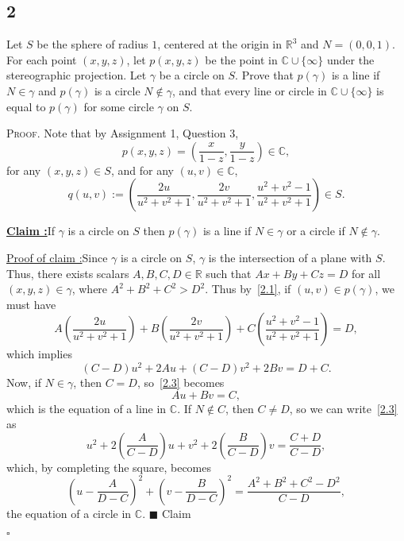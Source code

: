 \documentclass[12pt]{article}
\newcounter{ProofCounter}
\newcounter{ClaimCounter}[ProofCounter]
\newenvironment{Proof}{\stepcounter{ProofCounter}\textsc{Proof.}}{\hfill$\square$}
\newenvironment{claim}[1]{\vspace{1mm}\stepcounter{ClaimCounter}\par\noindent\underline{\bf Claim \theClaimCounter:}\space#1}{}
\newenvironment{claimproof}[1]{\par\noindent\underline{Proof of claim \theClaimCounter:}\space#1}{\hfill $\blacksquare$ Claim \theClaimCounter}
\begin{document}
\subsection*{2}
\begin{tcolorbox}
  Let $S$ be the sphere of radius $1$, centered at the origin in $\mathbb{R}^{3}$ and $N = (0,0,1)$. For each point $(x,y,z)$, let $p(x,y,z)$ be the
  point in $\mathbb{C}\cup \{\infty\}$ under the stereographic projection. Let $\gamma$ be a circle on $S$. Prove that $p(\gamma)$ is a line if
  $N \in \gamma$ and $p(\gamma)$ is a circle $N\notin \gamma$, and that every line or circle in $\mathbb{C}\cup\{\infty\}$ is equal to $p(\gamma)$ for
  some circle $\gamma$ on $S$.
\end{tcolorbox}
\begin{Proof}
  Note that by Assignment 1, Question 3,
  \begin{equation}
    p(x,y,z) = \left( \frac{x}{1 - z}, \frac{y}{1 - z}\right) \in \mathbb{C},
    \label{2.1}
  \end{equation}
  for any $(x,y,z) \in S$, and for any $(u,v) \in \mathbb{C}$,
  \begin{equation}
    q(u,v) := \left( \frac{2u}{u^{2} + v^{2} + 1}, \frac{2v}{u^{2} + v^{2} + 1}, \frac{u^{2} + v^{2} -1}{u^{2} + v^{2} + 1}\right) \in S. 
    \label{2.2}
  \end{equation}
  \begin{claim}
    If $\gamma$ is a circle on $S$ then $p(\gamma)$ is a line if $N \in \gamma$ or a circle if $N \notin \gamma$.
  \end{claim}
  \begin{claimproof}
    Since $\gamma$ is a circle on $S$, $\gamma$ is the intersection of a plane with $S$. Thus, there exists scalars $A,B,C,D \in \mathbb{R}$ such that 
    $Ax + By + Cz = D$ for all $(x,y,z) \in \gamma$, where $A^2 + B^2 + C^2 > D^{2}$. Thus by~\eqref{2.1}, if $(u,v) \in p(\gamma)$, we must have
    \[ A\left( \frac{2u}{u^{2} + v^{2} + 1} \right) + B\left( \frac{2v}{u^{2} + v^{2} + 1} \right) + C\left( \frac{u^{2} + v^{2} - 1}{u^{2} + v^{2} +
    1}\right) = D, \]
    which implies 
    \begin{equation}
      (C - D)u^{2} + 2Au + (C-D)v^{2} + 2Bv = D + C. 
      \label{2.3}
    \end{equation}
    Now, if $N \in \gamma$, then $C = D$, so~\eqref{2.3} becomes 
    \begin{equation}
      Au + Bv = C, 
      \label{2.4}
    \end{equation}
    which is the equation of a line in $\mathbb{C}$. If $N \notin C$, then $C \neq D$,
    so we can write~\eqref{2.3} as 
    \[ u^{2} + 2\left( \frac{A}{C - D}\right)u + v^{2} + 2\left( \frac{B}{C-D} \right)v = \frac{C + D}{C - D}, \]
    which, by completing the square, becomes 
    \begin{equation}
      \left( u - \frac{A}{D - C} \right)^{2} + \left( v - \frac{B}{D - C} \right)^{2} = \frac{A^2 + B^2 + C^2 - D^2}{C - D}, 
      \label{2.5}
    \end{equation}
    the equation of a circle in $\mathbb{C}$.
  \end{claimproof}


\end{Proof}
\end{document}
